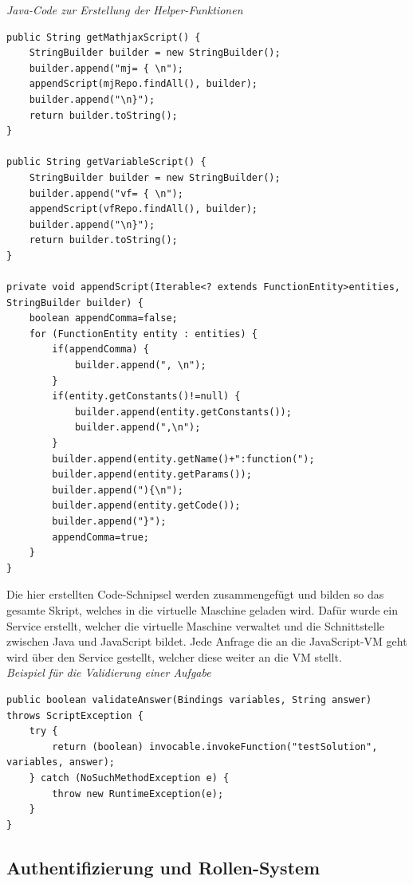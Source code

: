 \emph{Java-Code zur Erstellung der Helper-Funktionen}
\begin{lstlisting}
public String getMathjaxScript() {
	StringBuilder builder = new StringBuilder();
	builder.append("mj= { \n");
	appendScript(mjRepo.findAll(), builder);
	builder.append("\n}");
	return builder.toString();
}

public String getVariableScript() {
	StringBuilder builder = new StringBuilder();
	builder.append("vf= { \n");
	appendScript(vfRepo.findAll(), builder);
	builder.append("\n}");
	return builder.toString();
}

private void appendScript(Iterable<? extends FunctionEntity>entities, StringBuilder builder) {
	boolean appendComma=false;
	for (FunctionEntity entity : entities) {
		if(appendComma) {
			builder.append(", \n");
		}
		if(entity.getConstants()!=null) {
			builder.append(entity.getConstants());
			builder.append(",\n");
		}
		builder.append(entity.getName()+":function(");
		builder.append(entity.getParams());
		builder.append("){\n");
		builder.append(entity.getCode());
		builder.append("}");
		appendComma=true;
	}
}

\end{lstlisting}

Die hier erstellten Code-Schnipsel werden zusammengefügt und bilden so das gesamte Skript, welches in die virtuelle Maschine geladen wird. Dafür wurde ein Service erstellt, welcher die virtuelle Maschine verwaltet und die Schnittstelle zwischen Java und JavaScript bildet. Jede Anfrage die an die JavaScript-VM geht wird über den Service gestellt, welcher diese weiter an die VM stellt.\\

\emph{Beispiel für die Validierung einer Aufgabe}
\begin{lstlisting}
public boolean validateAnswer(Bindings variables, String answer) throws ScriptException {
	try {
		return (boolean) invocable.invokeFunction("testSolution", variables, answer);
	} catch (NoSuchMethodException e) {
		throw new RuntimeException(e);
	}
}
\end{lstlisting}


\subsection{Authentifizierung und Rollen-System}

